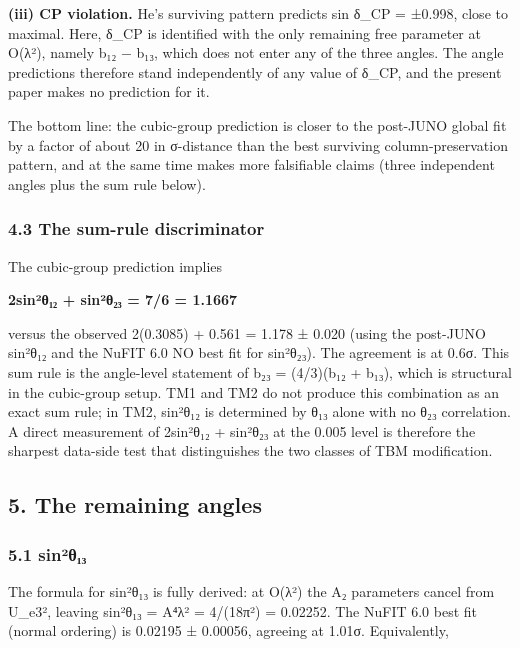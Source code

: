 \documentclass[
  11pt,
  letterpaper,
]{article}
\begin{document}
\textbf{(iii) CP violation.} He's surviving pattern predicts sin δ\_CP =
±0.998, close to maximal. Here, δ\_CP is identified with the only
remaining free parameter at O(λ²), namely b₁₂ − b₁₃, which does not
enter any of the three angles. The angle predictions therefore stand
independently of any value of δ\_CP, and the present paper makes no
prediction for it.

The bottom line: the cubic-group prediction is closer to the post-JUNO
global fit by a factor of about 20 in σ-distance than the best surviving
column-preservation pattern, and at the same time makes more falsifiable
claims (three independent angles plus the sum rule below).

\hypertarget{the-sum-rule-discriminator}{%
\subsubsection{4.3 The sum-rule
discriminator}\label{the-sum-rule-discriminator}}

The cubic-group prediction implies

\textbf{2sin²θ₁₂ + sin²θ₂₃ = 7/6 = 1.1667}

versus the observed 2(0.3085) + 0.561 = 1.178 ± 0.020 (using the
post-JUNO sin²θ₁₂ and the NuFIT 6.0 NO best fit for sin²θ₂₃). The
agreement is at 0.6σ. This sum rule is the angle-level statement of b₂₃
= (4/3)(b₁₂ + b₁₃), which is structural in the cubic-group setup. TM1
and TM2 do not produce this combination as an exact sum rule; in TM2,
sin²θ₁₂ is determined by θ₁₃ alone with no θ₂₃ correlation. A direct
measurement of 2sin²θ₁₂ + sin²θ₂₃ at the 0.005 level is therefore the
sharpest data-side test that distinguishes the two classes of TBM
modification.

\hypertarget{the-remaining-angles}{%
\subsection{5. The remaining angles}\label{the-remaining-angles}}

\hypertarget{sinuxb2ux3b8ux2081ux2083}{%
\subsubsection{5.1 sin²θ₁₃}\label{sinuxb2ux3b8ux2081ux2083}}

The formula for sin²θ₁₃ is fully derived: at O(λ²) the A₂ parameters
cancel from \textbar U\_e3\textbar², leaving sin²θ₁₃ = A⁴λ² = 4/(18π²) =
0.02252. The NuFIT 6.0 best fit (normal ordering) is 0.02195 ± 0.00056,
agreeing at 1.01σ. Equivalently,
\end{document}
